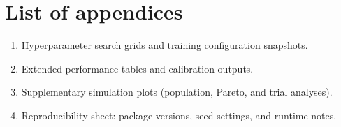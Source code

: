 \documentclass[a4paper,11pt,twoside]{report}
\begin{document}
\listoffigures
\thispagestyle{empty}


\listoftables
\thispagestyle{empty}

\chapter*{List of appendices}
\begin{enumerate}
\item Hyperparameter search grids and training configuration snapshots.
\item Extended performance tables and calibration outputs.
\item Supplementary simulation plots (population, Pareto, and trial analyses).
\item Reproducibility sheet: package versions, seed settings, and runtime notes.
\end{enumerate}
\thispagestyle{empty}

\end{document}
